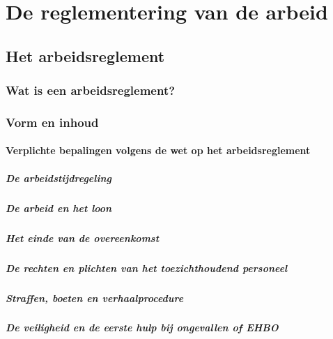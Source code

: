 \chapter{De reglementering van de arbeid}
\label{hoofdstuk:2}

\section{Het arbeidsreglement}

\subsection{Wat is een arbeidsreglement?}

\subsection{Vorm en inhoud}

\subsubsection{Verplichte bepalingen volgens de wet op het arbeidsreglement}

\paragraph{De arbeidstijdregeling}

\paragraph{De arbeid en het loon}

\paragraph{Het einde van de overeenkomst}

\paragraph{De rechten en plichten van het toezichthoudend personeel}

\paragraph{Straffen, boeten en verhaalprocedure}

\paragraph{De veiligheid en de eerste hulp bij ongevallen of EHBO}


